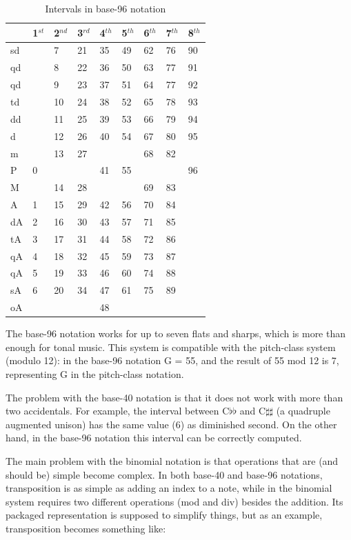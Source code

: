 \documentclass{article}
\begin{document}
\begin{table}
  \centering
  \begin{tabular}{l|llllllll}
    & 1$^{st}$& 2$^{nd}$& 3$^{rd}$& 4$^{th}$& 5$^{th}$& 6$^{th}$& 7$^{th}$& 8$^{th}$ \\
    \hline
    sd  &  & 7&21&35&49&62&76&90 \\
    qd  &  & 8&22&36&50&63&77&91 \\
    qd  &  & 9&23&37&51&64&77&92 \\
    td  &  &10&24&38&52&65&78&93 \\
    dd  &  &11&25&39&53&66&79&94 \\
    d   &  &12&26&40&54&67&80&95 \\
    m   &  &13&27&  &  &68&82&   \\
    P   & 0&  &  &41&55&  &  &96 \\
    M   &  &14&28&  &  &69&83&   \\
    A   & 1&15&29&42&56&70&84&   \\
    dA  & 2&16&30&43&57&71&85&   \\
    tA  & 3&17&31&44&58&72&86&   \\
    qA  & 4&18&32&45&59&73&87&   \\
    qA  & 5&19&33&46&60&74&88&   \\
    sA  & 6&20&34&47&61&75&89&   \\
    oA  &  &  &  &48&  &  &  &   
  \end{tabular}
  \caption{Intervals in base-96 notation}
  \label{tab:jama-intervalos}
\end{table}

The base-96 notation works for up to seven flats and sharps, which is
more than enough for tonal music. This system is compatible with the
pitch-class system (modulo 12): in the base-96 notation G = 55, and
the result of 55 mod 12 is 7, representing G in the pitch-class
notation. 

The problem with the base-40 notation is that it does not work with
more than two accidentals. For example, the interval between
C$\flat\flat$ and C$\sharp\sharp$ (a quadruple augmented unison) has
the same value (6) as diminished second. On the other hand, in the
base-96 notation this interval can be correctly computed.

The main problem with the binomial notation is that operations that
are (and should be) simple become complex. In both base-40 and base-96
notations, transposition is as simple as adding an index to a note,
while in the binomial system requires two different operations (mod
and div) besides the addition. Its packaged representation is supposed
to simplify things, but as an example, transposition becomes something
like:
\end{document}
